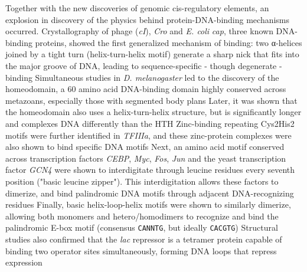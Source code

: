 Together with the new discoveries of genomic cis-regulatory elements, an explosion in discovery of the physics behind protein-DNA-binding mechanisms occurred. Crystallography of {{}{}} phage (\textit{cI}), \textit{Cro} and \textit{E. coli} \textit{cap}, three known DNA-binding proteins, showed the first generalized mechanism of binding: two {{\greekfont α}{}}-helices joined by a tight turn (helix-turn-helix motif) generate a sharp nick that fits into the major groove of DNA, leading to sequence-specific - though degenerate - binding Simultaneous studies in \textit{D. melanogaster} led to the discovery of the homeodomain, a 60 amino acid DNA-binding domain highly conserved across metazoans, especially those with segmented body plans Later, it was shown that the homeodomain also uses a helix-turn-helix structure, but is significantly longer and complexes DNA differently than the {}{} HTH Zinc-binding repeating Cys2His2 motifs were further identified in \textit{TFIIIa}, and these zinc-protein complexes were also shown to bind specific DNA motifs Next, an amino acid motif conserved across transcription factors \textit{CEBP}, \textit{Myc}, \textit{Fos}, \textit{Jun} and the yeast transcription factor \textit{GCN4} were shown to interdigitate through leucine residues every seventh position ("basic leucine zipper"). This interdigitation allows these factors to dimerize, and bind palindromic DNA motifs through adjacent DNA-recognizing residues Finally, basic helix-loop-helix motifs were shown to similarly dimerize, allowing both monomers and hetero/homodimers to recognize and bind the palindromic E-box motif (consensus \verb|CANNTG|, but ideally \verb|CACGTG|) Structural studies also confirmed that the \textit{lac} repressor is a tetramer protein capable of binding two operator sites simultaneously, forming DNA loops that repress expression

